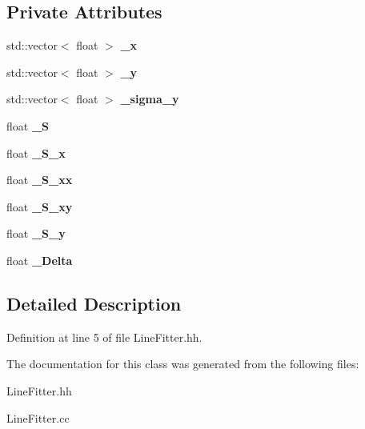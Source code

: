 \subsection*{Private Attributes}
\begin{DoxyCompactItemize}
\item 
std\-::vector$<$ float $>$ {\bfseries \-\_\-x}\label{classLineFitter_ae43423c2f6fe5ef3b9c2418ec231a570}

\item 
std\-::vector$<$ float $>$ {\bfseries \-\_\-y}\label{classLineFitter_adc9dca456fddfff7737eb7711319d156}

\item 
std\-::vector$<$ float $>$ {\bfseries \-\_\-sigma\-\_\-y}\label{classLineFitter_a255fc2f0df061e83fca7937458122ee1}

\item 
float {\bfseries \-\_\-\-S}\label{classLineFitter_a005727d31fe2adb0ca0fb0a5c8f5b07d}

\item 
float {\bfseries \-\_\-\-S\-\_\-x}\label{classLineFitter_a1c4328b5bfae8c57c2e644638125a71a}

\item 
float {\bfseries \-\_\-\-S\-\_\-xx}\label{classLineFitter_acd98cdf41dfb567e8cea616c88263cea}

\item 
float {\bfseries \-\_\-\-S\-\_\-xy}\label{classLineFitter_a278f1df0817c39933b3cab33b66532f8}

\item 
float {\bfseries \-\_\-\-S\-\_\-y}\label{classLineFitter_aeeb3cef703dc326c9ab58cc2c13a0bae}

\item 
float {\bfseries \-\_\-\-Delta}\label{classLineFitter_a1620b20e524128ea6eef19010bb82fe2}

\end{DoxyCompactItemize}


\subsection{Detailed Description}


Definition at line 5 of file Line\-Fitter.\-hh.



The documentation for this class was generated from the following files\-:\begin{DoxyCompactItemize}
\item 
Line\-Fitter.\-hh\item 
Line\-Fitter.\-cc\end{DoxyCompactItemize}
